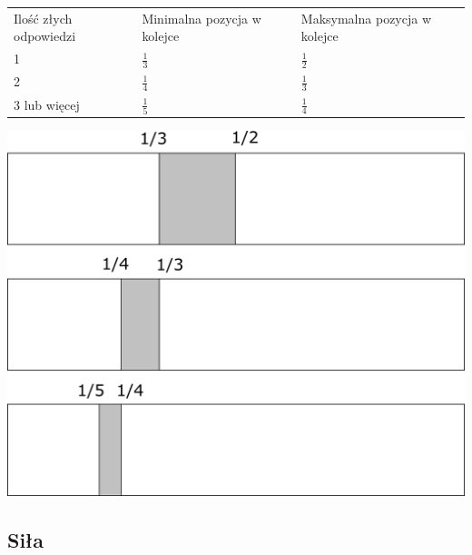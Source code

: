 \begin{center}
\begin{tabular}{| l | l | l |}
\hline
Ilość złych odpowiedzi  & Minimalna pozycja w kolejce & Maksymalna pozycja w kolejce \\ \Xhline{3\arrayrulewidth}

1 & $\frac{1}{3}$ & $\frac{1}{2}$   \\ \hline
2 & $\frac{1}{4}$  & $\frac{1}{3}$   \\ \hline
3 lub więcej & $\frac{1}{5}$   & $\frac{1}{4}$   \\ \hline
\end{tabular}
\label{table:internals}

\end{center}

\begin{center}
	\centering
	\includegraphics[width=\textwidth]{images/interval.png}
\end{center}


\newpage
\subsection{Siła}

